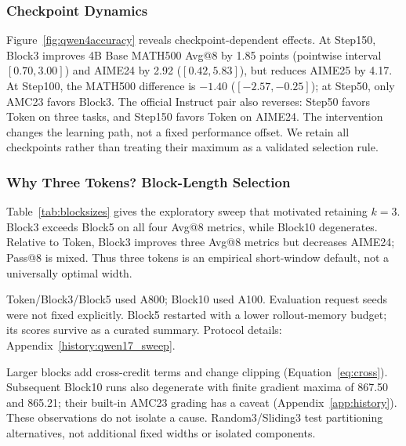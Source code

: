 \subsubsection{Checkpoint Dynamics}
Figure~\ref{fig:qwen4accuracy} reveals checkpoint-dependent effects. At Step150, Block3 improves 4B Base MATH500 Avg@8 by 1.85 points (pointwise interval $[0.70,3.00]$) and AIME24 by 2.92 ($[0.42,5.83]$), but reduces AIME25 by 4.17. At Step100, the MATH500 difference is $-1.40$ ($[-2.57,-0.25]$); at Step50, only AMC23 favors Block3. The official Instruct pair also reverses: Step50 favors Token on three tasks, and Step150 favors Token on AIME24. The intervention changes the learning path, not a fixed performance offset. We retain all checkpoints rather than treating their maximum as a validated selection rule.

\subsubsection{Why Three Tokens? Block-Length Selection}
\label{sec:blockchoice}
Table~\ref{tab:blocksizes} gives the exploratory sweep that motivated retaining $k=3$. Block3 exceeds Block5 on all four Avg@8 metrics, while Block10 degenerates. Relative to Token, Block3 improves three Avg@8 metrics but decreases AIME24; Pass@8 is mixed. Thus three tokens is an empirical short-window default, not a universally optimal width.

\begin{table}[htbp]
\centering\small
\caption{Historical block-length sweep: Qwen3-1.7B-Base student, 4B-GRPO teacher, DAPO, 200 updates, seed 21. Cells show Avg@8 / Pass@8 (\%); this is not the later same-host comparison.}
\label{tab:blocksizes}

\par\smallskip\footnotesize
Token/Block3/Block5 used A800; Block10 used A100. Evaluation request seeds were not fixed explicitly. Block5 restarted with a lower rollout-memory budget; its scores survive as a curated summary. Protocol details: Appendix~\ref{history:qwen17_sweep}.
\end{table}

Larger blocks add cross-credit terms and change clipping (Equation~\ref{eq:cross}). Subsequent Block10 runs also degenerate with finite gradient maxima of 867.50 and 865.21; their built-in AMC23 grading has a caveat (Appendix~\ref{app:history}). These observations do not isolate a cause. Random3/Sliding3 test partitioning alternatives, not additional fixed widths or isolated components.

